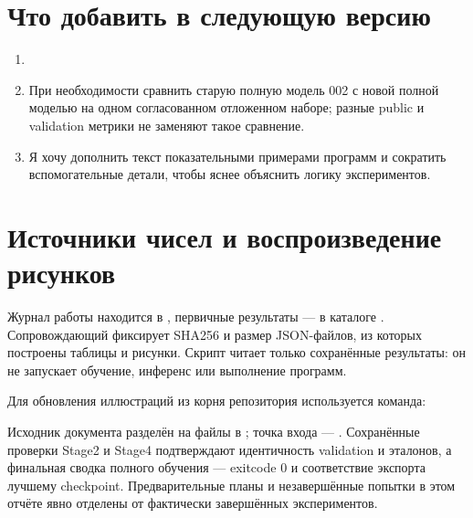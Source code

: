 \section{Что добавить в следующую версию}
\begin{enumerate}
\item {}
\item При необходимости сравнить старую полную модель 002 с новой
полной моделью на одном согласованном отложенном наборе;
разные public и validation метрики не заменяют такое сравнение.
\item Я хочу дополнить текст показательными примерами программ
и сократить вспомогательные детали, чтобы яснее объяснить логику экспериментов.
\end{enumerate}

\clearpage
\appendix
\section{Источники чисел и воспроизведение рисунков}
Журнал работы находится в , первичные результаты ---
в каталоге . Сопровождающий 
фиксирует SHA256 и размер JSON-файлов, из которых построены таблицы и рисунки.
Скрипт  читает только сохранённые результаты:
он не запускает обучение, инференс или выполнение программ.

Для обновления иллюстраций из корня репозитория используется команда:
\begin{quote}\small{}\end{quote}
Исходник документа разделён на
файлы в ; точка входа --- .
Сохранённые проверки Stage2 и Stage4 подтверждают идентичность
validation и эталонов, а финальная сводка полного обучения --- exitcode 0
и соответствие экспорта лучшему checkpoint.
Предварительные планы и незавершённые попытки в этом отчёте явно
отделены от фактически завершённых экспериментов.

